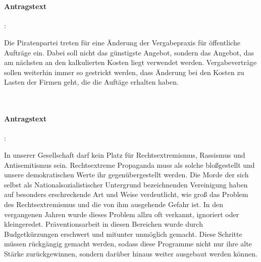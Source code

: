 
\\

\paragraph{Antragstext}:

Die Piratenpartei treten für eine Änderung der Vergabepraxis für öffentliche Aufträge ein. Dabei soll nicht das günstigste Angebot, sondern das Angebot, das am nächsten an den kalkulierten Kosten liegt verwendet werden. Vergabeverträge sollen weiterhin immer so gestrickt werden, dass Änderung bei den Kosten zu Lasten der Firmen geht, die die Auftäge erhalten haben.



\\

\paragraph{Antragstext}:

In unserer Gesellschaft darf kein Platz für Rechtsextremismus, Rassismus und Antisemitismus sein. Rechtsextreme Propaganda muss als solche bloßgestellt und unsere demokratischen Werte ihr gegenübergestellt werden. Die Morde der sich selbst als {\Gu}Nationalsozialistischer Untergrund{\Go} bezeichnenden Vereinigung haben auf besonders erschreckende Art und Weise verdeutlicht, wie groß das Problem des Rechtsextremismus und die von ihm ausgehende Gefahr ist. In den vergangenen Jahren wurde dieses Problem allzu oft verkannt, ignoriert oder kleingeredet. Präventionsarbeit in diesen Bereichen wurde durch Budgetkürzungen erschwert und mitunter unmöglich gemacht. Diese Schritte müssen rückgängig gemacht werden, sodass diese Programme nicht nur ihre alte Stärke zurückgewinnen, sondern darüber hinaus weiter ausgebaut werden können.

